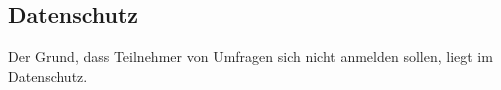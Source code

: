 \subsection{Datenschutz}
Der Grund, dass Teilnehmer von Umfragen sich nicht anmelden sollen, liegt im Datenschutz.
